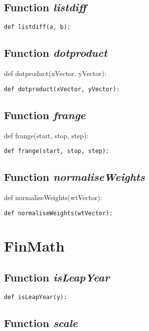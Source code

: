 \documentclass[twoside,11pt]{book}
\begin{document}
\subsection{Function {\it listdiff}}


\begin{lstlisting}
def listdiff(a, b):
\end{lstlisting}

\subsection{Function {\it dotproduct}}
def dotproduct(xVector, yVector):

\begin{lstlisting}
def dotproduct(xVector, yVector):
\end{lstlisting}

\subsection{Function {\it frange}}
def frange(start, stop, step):

\begin{lstlisting}
def frange(start, stop, step):
\end{lstlisting}

\subsection{Function {\it normaliseWeights}}
def normaliseWeights(wtVector):

\begin{lstlisting}
def normaliseWeights(wtVector):
\end{lstlisting}

\newpage
\section{FinMath}

\subsection{Function {\it isLeapYear}}


\begin{lstlisting}
def isLeapYear(y):
\end{lstlisting}

\subsection{Function {\it scale}}
\end{document}
